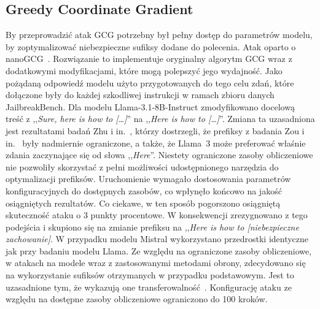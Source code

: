 \subsection{Greedy Coordinate Gradient}
By przeprowadzić atak \gls{GCG} potrzebny był pełny dostęp do parametrów modelu, by zoptymalizować niebezpieczne sufiksy dodane do polecenia. Atak oparto o nanoGCG~\cite{nanogcg}. Rozwiązanie to implementuje oryginalny algorytm \gls{GCG} wraz z dodatkowymi modyfikacjami, które mogą polepszyć jego wydajność. Jako pożądaną odpowiedź modelu użyto przygotowanych do tego celu zdań, które dołączone były do każdej szkodliwej instrukcji w ramach zbioru danych JailbreakBench. Dla modelu Llama-3.1-8B-Instruct zmodyfikowano docelową treść z ,,\textit{Sure, here is how to [\dots]}'' na ,,\textit{Here is how to [\dots]}''. Zmiana ta uzasadniona jest rezultatami badań Zhu i in.~\cite{zhu2025advprefixobjectivenuancedllm}, którzy dostrzegli, że prefiksy z badania Zou i in.~\cite{zou2023universaltransferableadversarialattacks} były nadmiernie ograniczone, a także, że Llama~3 może preferować właśnie zdania zaczynające się od słowa ,,\textit{Here}''. Niestety ograniczone zasoby obliczeniowe nie pozwoliły skorzystać z pełni możliwości udostępnionego narzędzia do optymalizacji prefiksów. Uruchomienie wymagało dostosowania parametrów konfiguracyjnych do dostępnych zasobów, co wpłynęło końcowo na jakość osiągniętych rezultatów. Co ciekawe, w ten sposób pogorszono osiągniętą skuteczność ataku o 3 punkty procentowe. W konsekwencji zrezygnowano z tego podejścia i skupiono się na zmianie prefiksu na ,,\textit{Here is how to [niebezpieczne zachowanie]}. W przypadku modelu Mistral wykorzystano przedrostki identyczne jak przy badaniu modelu Llama.
Ze względu na ograniczone zasoby obliczeniowe, w atakach na modele wraz z zastosowanymi metodami obrony, zdecydowano się na wykorzystanie sufiksów otrzymanych w przypadku podstawowym. Jest to uzasadnione tym, że wykazują one transferowalność~\cite{zou2023universaltransferableadversarialattacks}. Konfigurację ataku ze względu na dostępne zasoby obliczeniowe ograniczono do 100 kroków.
